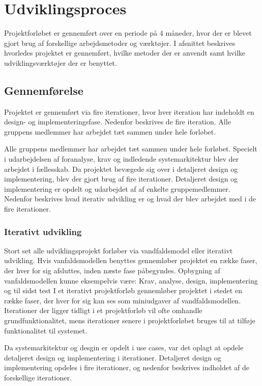 \section{Udviklingsproces}
Projektforløbet er gennemført over en periode på 4 måneder, hvor der er blevet gjort brug af forskellige arbejdsmetoder og værktøjer. I afsnittet beskrives hvorledes projektet er gennemført, hvilke metoder der er anvendt samt hvilke udviklingsværktøjer der er benyttet.

\subsection{Gennemførelse}
Projektet er gennemført via fire iterationer, hvor hver iteration har indeholdt en design- og implementeringsfase. Nedenfor beskrives de fire iteration. Alle gruppens medlemmer har arbejdet tæt sammen under hele forløbet.

Alle gruppens medlemmer har arbejdet tæt sammen under hele forløbet. Specielt i udarbejdelsen af foranalyse, krav og indledende systemarkitektur blev der arbejdet i fællesskab. 
Da projektet bevægede sig over i detaljeret design og implementering, blev der gjort brug af fire iterationer. Detaljeret design og implementering er opdelt og udarbejdet af af enkelte gruppemedlemmer. Nedenfor beskrives hvad iterativ udvikling er og hvad der blev arbejdet med i de fire iterationer.


\subsubsection{Iterativt udvikling}
Stort set alle udviklingsprojekt forløber via vandfaldsmodel eller iterativt udvikling. 
Hvis vanfaldsmodellen benyttes gennemløber projektet en række faser, der hver for sig afsluttes, inden næste fase påbegyndes. Opbygning af vanfaldsmodellen kunne eksempelvis være: Krav, analyse, design, implementering og til sidst test
I et iterativt projektforløb gennemløber projektet i stedet en række faser, der hver for sig kan ses som miniudgaver af vandfaldsmodellen. Iterationer der ligger tidligt i et projektforløb vil ofte omhandle grundfunktionalitet, mens iterationer senere i projektforløbet bruges til at tilføje funktionalitet til systemet. 

Da systemarkitektur og desgin er opdelt i use cases, var det oplagt at opdele detaljeret design og implementering  i iterationer. Detaljeret design og implementering opdeles i fire iterationer, og nedenfor beskrives indholdet af de forskellige iterationer.  

